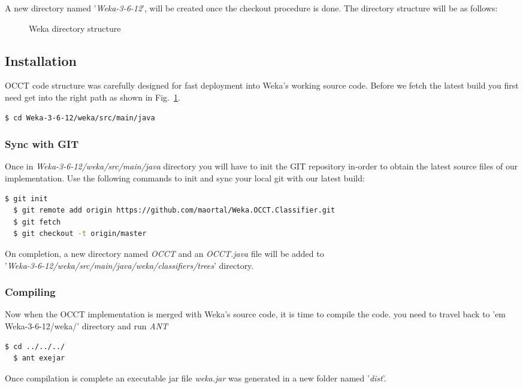 \documentclass[a4paper,12pt]{article}
\newcommand{\newpar}{\smallskip\noindent} %
\begin{document}
\begin{spacing}{1.5}
\newpar
A new directory named '{\em Weka-3-6-12}', will be created once the checkout procedure is done.
The directory structure will be as follows:
\begin{figure}[!h]
    \caption{Weka directory structure}
    \label{fig:wekadir}
\end{figure}

\subsection{Installation}
OCCT code structure was carefully designed for fast deployment into Weka's working source code.
Before we fetch the latest build you first need get into the right path as shown in Fig.~\ref{fig:wekadir}.
\begin{lstlisting}[language=bash,frame=none,backgroundcolor=\color{anti-flashwhite}]
  $ cd Weka-3-6-12/weka/src/main/java
\end{lstlisting}

\subsubsection{Sync with GIT}
Once in {\em Weka-3-6-12/weka/src/main/java} directory you will have to init the GIT repository in-order to obtain the latest source files of our implementation.
Use the following commands to init and sync your local git with our latest build:
\begin{lstlisting}[language=bash,frame=none,backgroundcolor=\color{anti-flashwhite}]
  $ git init
  $ git remote add origin https://github.com/maortal/Weka.OCCT.Classifier.git
  $ git fetch
  $ git checkout -t origin/master
\end{lstlisting}
\newpar
On completion, a new directory named {\em OCCT} and an {\em OCCT.java} file will be added to\\
'{\em Weka-3-6-12/weka/src/main/java/weka/classifiers/trees}' directory.

\subsubsection{Compiling}
Now when the OCCT implementation is merged with Weka's source code, it is time to compile the code.
you need to travel back to '{em Weka-3-6-12/weka/}' directory and run {\em ANT}
\begin{lstlisting}[language=bash,frame=none,backgroundcolor=\color{anti-flashwhite}]
  $ cd ../../../
  $ ant exejar
\end{lstlisting}
Once compilation is complete an executable jar file {\em weka.jar} was generated in a new folder named '{\em dist}'.









\end{spacing}
\end{document}
